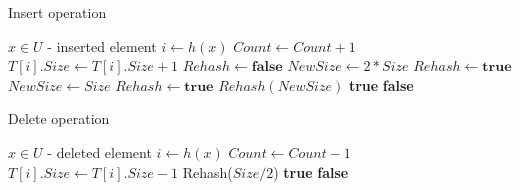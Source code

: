 \begin{algorithm}[ph!]
\caption{Insert operation}
\label{algorithm-insert}
\begin{algorithmic}
\REQUIRE $x \in U$ - inserted element
\STATE $i \leftarrow h(x)$
	\STATE {}
	\STATE $Count \leftarrow Count + 1$
	\STATE $T[i].Size \leftarrow T[i].Size + 1$
	\STATE
	\STATE $Rehash \leftarrow \mathbf{false}$
	\STATE {}
		\STATE $NewSize \leftarrow 2 * Size$
		\STATE $Rehash \leftarrow \mathbf{true}$
	\ELSE
		\STATE $NewSize \leftarrow Size$	
	\ENDIF
	\STATE
	\STATE {}
		\STATE $Rehash \leftarrow \mathbf{true}$
	\ENDIF
	\STATE
	\STATE {}
		\STATE $Rehash(NewSize)$
	\ENDIF
	\STATE
	\RETURN \textbf{true} 
\ELSE
	\RETURN \textbf{false} 
\ENDIF
\end{algorithmic}
\end{algorithm}

\begin{algorithm}[H]
\caption{Delete operation}
\label{algorithm-delete}
\begin{algorithmic}
\REQUIRE $x \in U$ - deleted element
\STATE
$i \leftarrow h(x)$
	\STATE $Count \leftarrow Count - 1$
	\STATE $T[i].Size \leftarrow T[i].Size - 1$
	\STATE
		\STATE Rehash($Size / 2$)
	\ENDIF
	\STATE
	\RETURN \textbf{true} 
\ELSE
	\RETURN \textbf{false} 
\ENDIF
\end{algorithmic}
\end{algorithm}
